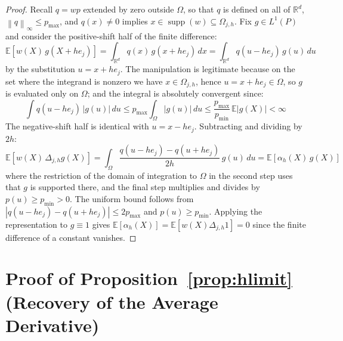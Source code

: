 \documentclass[12pt]{article}
\newcommand{\norm}[1]{\left\| #1 \right\|}
\newcommand{\R}{\mathbb{R}}
\newcommand{\E}{\mathbb{E}}
\newcommand{\abs}[1]{\left| #1 \right|}
\newcommand{\Dh}{\Delta_{j,h}}
\begin{document}
	\begin{proof}
		Recall $q = wp$ extended by zero outside $\Omega$, so that $q$ is defined on
		all of $\R^d$, $\norm{q}_\infty \leq p_{\max}$, and $q(x) \neq 0$ implies
		$x \in \operatorname{supp}(w) \subseteq \Omega_{j,h}$. Fix $g \in L^1(P)$ and
		consider the positive-shift half of the finite difference:
		\begin{equation}
			\E\left[w(X)\, g(X + h e_j)\right]
			= \int_{\R^d} q(x)\, g(x + h e_j)\, dx
			= \int_{\R^d} q(u - h e_j)\, g(u)\, du
		\end{equation}
		by the substitution $u = x + h e_j$. The manipulation is legitimate because
		on the set where the integrand is nonzero we have $x \in \Omega_{j,h}$, hence
		$u = x + h e_j \in \Omega$, so $g$ is evaluated only on $\Omega$; and the
		integral is absolutely convergent since:
		\begin{equation}
			\int q(u - h e_j)\, \abs{g(u)}\, du
			\leq p_{\max} \int_\Omega \abs{g(u)}\, du
			\leq \frac{p_{\max}}{p_{\min}} \, \E\abs{g(X)} < \infty
		\end{equation}
		The negative-shift half is identical with $u = x - h e_j$. Subtracting and
		dividing by $2h$:
		\begin{equation}
			\E\left[w(X)\, \Dh g(X)\right]
			= \int_\Omega \frac{q(u - h e_j) - q(u + h e_j)}{2h}\, g(u)\, du
			= \E\left[\alpha_h(X)\, g(X)\right]
		\end{equation}
		where the restriction of the domain of integration to $\Omega$ in the second
		step uses that $g$ is supported there, and the final step multiplies and
		divides by $p(u) \geq p_{\min} > 0$. The uniform bound follows from
		$\abs{q(u - h e_j) - q(u + h e_j)} \leq 2 p_{\max}$ and $p(u) \geq p_{\min}$.
		Applying the representation to $g \equiv 1$ gives
		$\E[\alpha_h(X)] = \E[w(X) \Dh 1] = 0$ since the finite difference of a
		constant vanishes.
	\end{proof}
	
	\section{Proof of Proposition~\ref{prop:hlimit} (Recovery of the Average
		Derivative)}
	\label{app:prop_hlimit}
	
\end{document}
